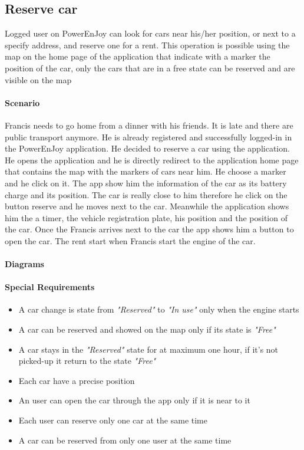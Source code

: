 \subsection{Reserve car}
Logged user on PowerEnJoy can look for cars near his/her position, or next to a specify address, and reserve one for a rent. This operation is possible using the map on the home page of the application that indicate with a marker the position of the car, only the cars that are in a free state can be reserved and are visible on the map
\paragraph{Scenario}
Francis needs to go home from a dinner with his friends. It is late and there are public transport anymore. He is already registered and successfully logged-in in the PowerEnJoy application. He decided to reserve a car using the application. He opens the application and he is directly redirect to the application home page that contains the map with the markers of cars near him. He choose a marker and he click on it. The app show him the information of the car as its battery charge and its position. The car is really close to him therefore he click on the button reserve and he moves next to the car. Meanwhile the application shows him the  a timer, the vehicle registration plate, his position and the position of the car. Once the Francis arrives next to the car the app shows him a button to open the car. The rent start when Francis start the engine of the car.
\paragraph{Diagrams}
\paragraph{Special Requirements}
\begin{itemize}
	\item A car change is state from \emph{"Reserved"} to \emph{"In use"} only when the engine starts
	\item A car can be reserved and showed on the map only if its state is \emph{"Free"}
	\item A car stays in the \emph{"Reserved"} state for at maximum one hour, if it's not picked-up it return to the state \emph{"Free"}
	\item Each car have a precise position
	\item An user can open the car through the app only if it is near to it
	\item Each user can reserve only one car at the same time
	\item A car can be reserved from only one user at the same time
\end{itemize}

